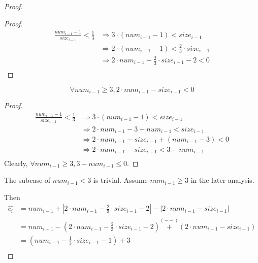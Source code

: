 \begin{proof}
    \begin{proof}
        \begin{equation*}
        \begin{split}
            \frac{num_{i-1}-1}{size_{i-1}} < \frac{1}{3}
            & \Longrightarrow 3 \cdot (num_{i-1} - 1) < size_{i-1} \\
            & \Longrightarrow 2 \cdot (num_{i-1} - 1) < \frac{2}{3} \cdot size_{i-1} \\
            & \Longrightarrow 2 \cdot num_{i-1} - \frac{2}{3} \cdot size_{i-1} - 2 < 0 \\
        \end{split}
        \end{equation*}
    \end{proof}

    \begin{lemma}
        \begin{equation*}
            \forall num_{i-1} \geq 3, 
            2 \cdot num_{i-1} - size_{i-1} < 0
        \end{equation*}
    \end{lemma}

    \begin{proof}
        \begin{equation*}
        \begin{split}
            \frac{num_{i-1}-1}{size_{i-1}} < \frac{1}{3}
            & \Longrightarrow 3 \cdot (num_{i-1} - 1) < size_{i-1} \\
            & \Longrightarrow 2 \cdot num_{i-1} - 3 + num_{i-1} < size_{i-1} \\
            & \Longrightarrow 2 \cdot num_{i-1} - size_{i-1} + (num_{i-1} - 3) < 0 \\
            & \Longrightarrow 2 \cdot num_{i-1} - size_{i-1} < 3 - num_{i-1} \\
        \end{split}
        \end{equation*}
        Clearly, $\forall num_{i-1} \geq 3, 3 - num_{i-1} \leq 0$.
    \end{proof}

    The subcase of $num_{i-1} < 3$ is trivial.
    Assume $num_{i-1} \geq 3$ in the later analysis.

    Then
    \begin{equation*}
    \begin{split}
        \hat{c_i} & = num_{i-1} + | 2 \cdot num_{i-1} - \frac{2}{3} \cdot size_{i-1} - 2 | 
            - | 2 \cdot num_{i-1} - size_{i-1} | \\
        & = num_{i-1} - ( 2 \cdot num_{i-1} - \frac{2}{3} \cdot size_{i-1} - 2 ) 
            \overset{(--)}{+} ( 2 \cdot num_{i-1} - size_{i-1} ) \\
        & = (num_{i-1} - \frac{1}{3} \cdot size_{i-1} - 1) + 3 \\
    \end{split}
    \end{equation*}


\end{proof}

